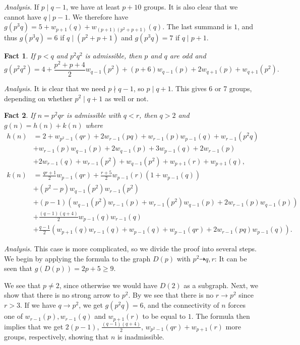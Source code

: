 \documentclass[a4paper, 12pt]{article}
\newcommand{\hthref}[1]{\hyperref[#1]{\thref{#1}}}
\theoremstyle{plain}
\newtheorem{eufact}{Fact}[section]
\theoremstyle{definition}
\begin{document}
\textit{Analysis.} If $p \mid q - 1$, we have at least $p + 10$ groups. It is also clear that we cannot have $q \mid p - 1$. We therefore have $g(p^3 q) = 5 + w_{p + 1}(q) + w_{(p + 1)(p^2 + p + 1)}(q)$. The last summand is $1$, and thus $g(p^3 q) = 6$ if $q \mid (p^2 + p + 1)$ and $g(p^3 q) = 7$ if $q \mid p + 1$.

\begin{eufact}
	If $p < q$ and $p^2 q^2$ is admissible, then $p$ and $q$ are odd and
	\[g(p^2 q^2) = 4 + \frac{p^2 + p + 4}{2} w_{q - 1}(p^2) + (p + 6)w_{q - 1}(p) + 2w_{q + 1}(p) + w_{q + 1}(p^2).\]
\end{eufact}

\textit{Analysis.} It is clear that we need $p \nmid q - 1$, so $p \mid q + 1$. This gives 6 or 7 groups, depending on whether $p^2 \mid q + 1$ as well or not.

\begin{eufact} 
	If $n = p^2 q r$ is admissible with $q < r$, then $q > 2$ and $g(n) = h(n) + k(n)$ where$$\begin{aligned}
		h(n) &= 2 + w_{p^2 - 1}(qr) + 2w_{r - 1}(pq) + w_{r - 1}(p)w_{p - 1}(q) + w_{r - 1}(p^2 q) \\ 
		&+ w_{r - 1}(p)w_{q - 1}(p) + 2w_{q - 1}(p) + 3w_{p - 1}(q) + 2w_{r - 1}(p) \\ 
		&+ 2w_{r - 1}(q) + w_{r - 1}(p^2) + w_{q - 1}(p^2) + w_{p + 1}(r) + w_{p + 1}(q), \\
		k(n) &= \frac{qr + 1}{2} w_{p - 1}(qr) + \frac{r + 5}{2} w_{p - 1}(r)(1 + w_{p - 1}(q))\\
		&+ (p^2 - p)w_{q - 1}(p^2)w_{r - 1}(p^2) \\
		&+ (p - 1)(w_{q - 1}(p^2)w_{r - 1}(p) + w_{r - 1}(p^2)w_{q - 1}(p) + 2w_{r - 1}(p)w_{q - 1}(p)) \\
		&+ \frac{(q - 1)(q + 4)}{2} w_{p - 1}(q)w_{r - 1}(q) \\
		&+ \frac{q - 1}{2} (w_{p + 1}(q)w_{r - 1}(q) + w_{p - 1}(q) + w_{p - 1}(qr) + 2w_{r - 1}(pq)w_{p - 1}(q)).
	\end{aligned}$$
\end{eufact}

\textit{Analysis.} This case is more complicated, so we divide the proof into several steps. We begin by applying the formula to the graph $D(p)$ with $p^2 \dashrightarrow q, r$: It can be seen that $g(D(p)) = 2p + 5 \ge 9$.

We see that $p \neq 2$, since otherwise we would have $D(2)$ as a subgraph. Next, we show that there is no strong arrow to $p^2$. By \hthref{euppq} we see that there is no $r \rightarrow p^2$ since $r > 3$. If we have $q \rightarrow p^2$, we get $g(p^2 q) = 6$, and the connectivity of $n$ forces one of $w_{r - 1}(p), w_{r - 1}(q)$ and $w_{p + 1}(r)$ to be equal to $1$. The formula then implies that we get
$2(p - 1)$, $\frac{(q - 1)(q + 4)}{2}$,  $w_{p^2 - 1}(qr) + w_{p + 1}(r)$
more groups, respectively, showing that $n$ is inadmissible. 
\end{document}
